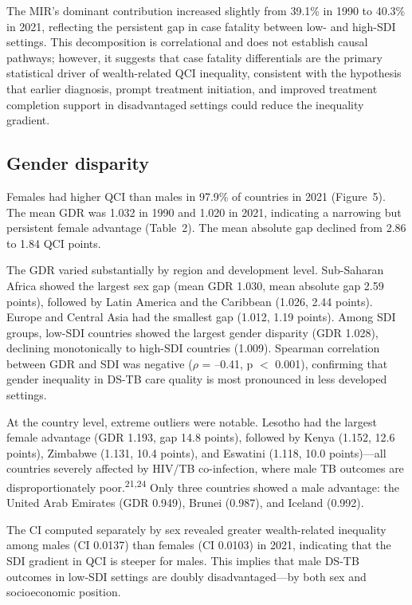 \documentclass[12pt]{article}
\begin{document}
The MIR's dominant contribution increased slightly from 39.1\% in 1990 to 40.3\% in 2021, reflecting the persistent gap in case fatality between low- and high-SDI settings. This decomposition is correlational and does not establish causal pathways; however, it suggests that case fatality differentials are the primary statistical driver of wealth-related QCI inequality, consistent with the hypothesis that earlier diagnosis, prompt treatment initiation, and improved treatment completion support in disadvantaged settings could reduce the inequality gradient.

\subsection{Gender disparity}

Females had higher QCI than males in 97.9\% of countries in 2021 (Figure~5). The mean GDR was 1.032 in 1990 and 1.020 in 2021, indicating a narrowing but persistent female advantage (Table~2). The mean absolute gap declined from 2.86 to 1.84 QCI points.

The GDR varied substantially by region and development level. Sub-Saharan Africa showed the largest sex gap (mean GDR 1.030, mean absolute gap 2.59 points), followed by Latin America and the Caribbean (1.026, 2.44 points). Europe and Central Asia had the smallest gap (1.012, 1.19 points). Among SDI groups, low-SDI countries showed the largest gender disparity (GDR 1.028), declining monotonically to high-SDI countries (1.009). Spearman correlation between GDR and SDI was negative ($\rho$ = --0.41, p $<$ 0.001), confirming that gender inequality in DS-TB care quality is most pronounced in less developed settings.

At the country level, extreme outliers were notable. Lesotho had the largest female advantage (GDR 1.193, gap 14.8 points), followed by Kenya (1.152, 12.6 points), Zimbabwe (1.131, 10.4 points), and Eswatini (1.118, 10.0 points)---all countries severely affected by HIV/TB co-infection, where male TB outcomes are disproportionately poor.\textsuperscript{21,24} Only three countries showed a male advantage: the United Arab Emirates (GDR 0.949), Brunei (0.987), and Iceland (0.992).

The CI computed separately by sex revealed greater wealth-related inequality among males (CI 0.0137) than females (CI 0.0103) in 2021, indicating that the SDI gradient in QCI is steeper for males. This implies that male DS-TB outcomes in low-SDI settings are doubly disadvantaged---by both sex and socioeconomic position.
\end{document}
